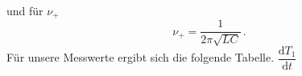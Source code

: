 und für $\nu_+$ 
\begin{equation*}
    \nu_+     =\dfrac{1}{2\pi \sqrt{LC}}\,.
\end{equation*}
Für unsere Messwerte ergibt sich die folgende Tabelle.
{$\dfrac{\text{d}T_1}{\text{d}t}$}
\begin{table}[H]
    \centering
    \begin{tabular}{S S S S S S S}
      \toprule
      & {$\dfrac{\C_k}{\nano\farad}$} & {$\dfrac{\nu^⁻_t}{\kilo\hertz$} & {$\dfrac{\nu^-_e}{\kilo\hertz$}\\
      \midrule
      


      \bottomrule
    \end{tabular}
    \caption{Die theoretischen und experimentellen Eigenfrequenz des Schwingkreises}
  \end{table}